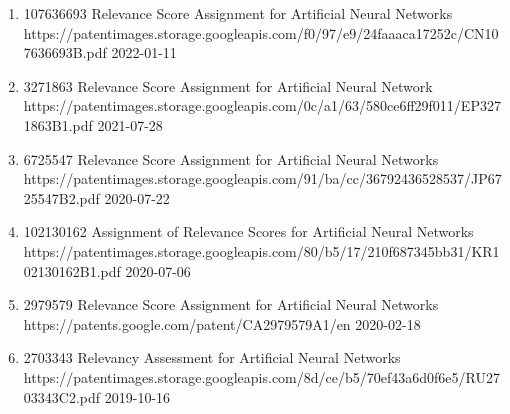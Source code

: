 \documentclass[10pt,a4paper]{article} %
\begin{document}
{
    \begin{enumerate}
        \item[] 
                          {107636693}
                          {Relevance Score Assignment for Artificial Neural Networks}
                          {https://patentimages.storage.googleapis.com/f0/97/e9/24faaaca17252c/CN107636693B.pdf}
                          {2022-01-11}

        \item [] 
                           {3271863}
                           {Relevance Score Assignment for Artificial Neural Network}
                           {https://patentimages.storage.googleapis.com/0c/a1/63/580ce6ff29f011/EP3271863B1.pdf}
                           {2021-07-28}

        \item [] 
                           {6725547}
                           {Relevance Score Assignment for Artificial Neural Networks}
                           {https://patentimages.storage.googleapis.com/91/ba/cc/36792436528537/JP6725547B2.pdf}
                           {2020-07-22}

        \item [] 
                           {102130162}
                           {Assignment of Relevance Scores for Artificial Neural Networks}
                           {https://patentimages.storage.googleapis.com/80/b5/17/210f687345bb31/KR102130162B1.pdf}
                           {2020-07-06}

        \item [] 
                           {2979579}
                           {Relevance Score Assignment for Artificial Neural Networks}
                           {https://patents.google.com/patent/CA2979579A1/en}
                           {2020-02-18}

        \item [] 
                           {2703343}
                           {Relevancy Assessment for Artificial Neural Networks}
                           {https://patentimages.storage.googleapis.com/8d/ce/b5/70ef43a6d0f6e5/RU2703343C2.pdf}
                           {2019-10-16}
    \end{enumerate}
}


\spacedhrule{1.6em}{-0.4em} %
\end{document}
